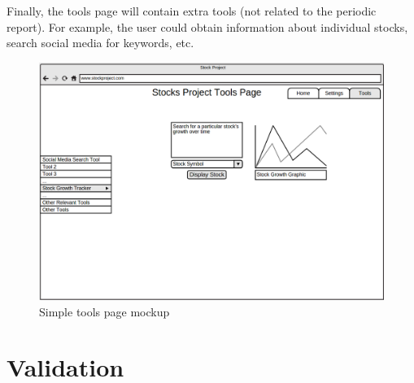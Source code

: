 \documentclass[12pt,a4paper]{article}
\begin{document}
Finally, the tools page will contain extra tools (not related to the periodic report). For example, the user could obtain information about individual stocks, search social media for keywords, etc.

\begin{figure}[h!]
  \centering
  \includegraphics[scale=0.3]{toolspage.png}
  \caption{Simple tools page mockup}
\end{figure}

\section{Validation}
 
\end{document}
